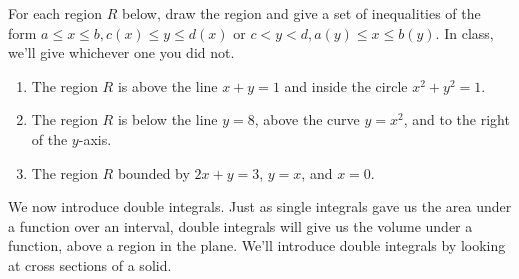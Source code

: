 \begin{problem}
For each region $R$ below, draw the region and give a set of inequalities of the form $a\leq x\leq b, c(x)\leq y\leq d(x)$ or $c<y<d, a(y)\leq x\leq b(y)$. In class, we'll give whichever one you did not.
\begin{enumerate}
 \item The region $R$ is above the line $x+y=1$ and inside the circle $x^2+y^2=1$.
 \item The region $R$ is below the line $y=8$, above the curve $y=x^2$, and to the right of the $y$-axis.
 \item The region $R$ bounded by $2x+y=3$, $y=x$, and $x=0$. 
\end{enumerate}
\end{problem}

We now introduce double integrals. Just as single integrals gave us the area under a function over an interval, double integrals will give us the volume under a function, above a region in the plane.  We'll introduce double integrals by looking at cross sections of a solid.


